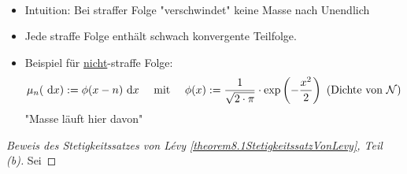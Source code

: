 \begin{bemerkung}\
	\begin{itemize}
		\item Intuition: Bei straffer Folge "verschwindet" keine Masse nach Unendlich
		\item Jede straffe Folge enthält schwach konvergente Teilfolge.
		\item Beispiel für \underline{nicht}-straffe Folge: 
		\begin{align*}
			\mu_n(\text{ d} x):=\phi(x-n)\text{ d} x
			\quad\text{ mit }\quad
			\phi(x):=\frac{1}{\sqrt{2\cdot\pi}}\cdot\exp\left(-\frac{x^2}{2}\right)\text{ (Dichte von }\mathcal{N})
		\end{align*}
		"Masse läuft hier davon"
	\end{itemize}
\end{bemerkung}

\begin{proof}[Beweis des Stetigkeitssatzes von Lévy \ref{theorem8.1StetigkeitssatzVonLevy}, Teil (b)]\enter
	Sei
\end{proof}



